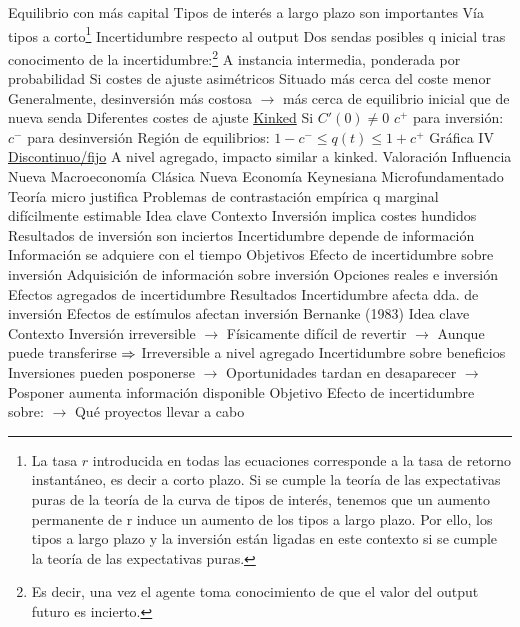 \documentclass{nuevotema}
\begin{document}
\begin{esquemal}
				\4[] Equilibrio con más capital
				\4 Tipos de interés a largo plazo son importantes
				\4[] Vía tipos a corto\footnote{La tasa $r$ introducida en todas las ecuaciones corresponde a la tasa de retorno instantáneo, es decir a corto plazo. Si se cumple la teoría de las expectativas puras de la teoría de la curva de tipos de interés, tenemos que un aumento permanente de r induce un aumento de los tipos a largo plazo. Por ello, los tipos a largo plazo y la inversión están ligadas en este contexto si se cumple la teoría de las expectativas puras.}
			\3 Incertidumbre respecto al output
				\4 Dos sendas posibles
				\4 q inicial tras conocimento de la incertidumbre:\footnote{Es decir, una vez el agente toma conocimiento de que el valor del output futuro es incierto.}
				\4[] A instancia intermedia, ponderada por probabilidad
				\4 Si costes de ajuste asimétricos
				\4[] Situado más cerca del coste menor
				\4[] Generalmente, desinversión más costosa
				\4[] $\to$ más cerca de equilibrio inicial que de nueva senda
			\3 Diferentes costes de ajuste
				\4 \underline{Kinked}
				\4 Si $C'\left( 0 \right) \neq  0$
				\4 $c^+$ para inversión:
				\4 $c^-$ para desinversión
				\4 Región de equilibrios: $1-c^- \leq q(t) \leq 1+c^+$
				\4 Gráfica IV
				\4 \underline{Discontinuo/fijo}
				\4[] A nivel agregado, impacto similar a kinked.
		\2 Valoración
			\3 Influencia
				\4 Nueva Macroeconomía Clásica
				\4 Nueva Economía Keynesiana
			\3 Microfundamentado
				\4 Teoría micro justifica
			\3 Problemas de contrastación empírica
				\4 q marginal difícilmente estimable
	\1 
		\2 Idea clave
			\3 Contexto
				\4 Inversión implica costes hundidos
				\4 Resultados de inversión son inciertos
				\4 Incertidumbre depende de información
				\4 Información se adquiere con el tiempo
			\3 Objetivos
				\4 Efecto de incertidumbre sobre inversión
				\4 Adquisición de información sobre inversión
				\4 Opciones reales e inversión
				\4 Efectos agregados de incertidumbre
			\3 Resultados
				\4 Incertidumbre afecta dda. de inversión
				\4 Efectos de estímulos afectan inversión
		\2 Bernanke (1983)
			\3 Idea clave
				\4 Contexto
				\4[] Inversión irreversible
				\4[] $\to$ Físicamente difícil de revertir
				\4[] $\to$ Aunque puede transferirse
				\4[] $\Rightarrow$ Irreversible a nivel agregado
				\4[] Incertidumbre sobre beneficios
				\4[] Inversiones pueden posponerse
				\4[] $\to$ Oportunidades tardan en desaparecer
				\4[] $\to$ Posponer aumenta información disponible
				\4 Objetivo
				\4[] Efecto de incertidumbre sobre:
				\4[] $\to$ Qué proyectos llevar a cabo

\end{esquemal}
\end{document}

